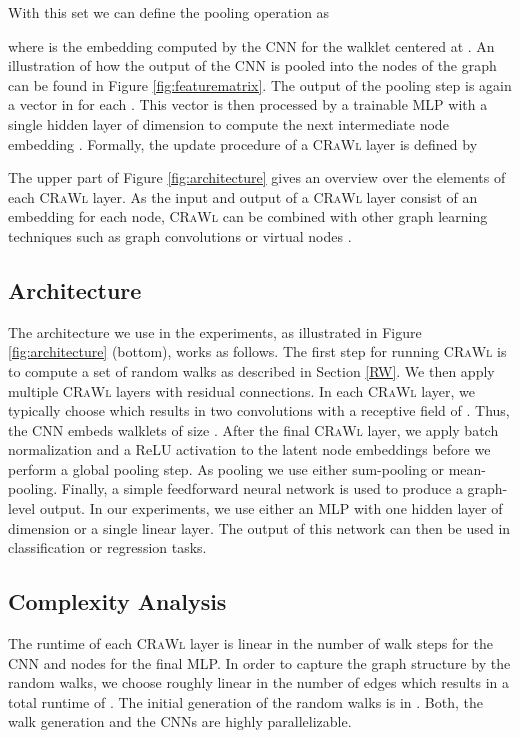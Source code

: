 \documentclass{scrartcl} \usepackage[dvipsnames]{xcolor}
\newcommand{\crawl}{\textsc{CRaWl}}
\begin{document}
    With this set we can define the pooling operation as
    
where  is the embedding computed by the CNN for the walklet  centered at .
    An illustration of how the output of the CNN is pooled into the nodes of the graph can be found in Figure \ref{fig:featurematrix}.
    The output of the pooling step is again a vector in  for each .
    This vector is then processed by a trainable MLP  with a single hidden layer of dimension  to compute the next intermediate node embedding .
Formally, the update procedure of a \crawl{} layer is defined by
    
    The upper part of Figure \ref{fig:architecture} gives an overview over the elements of each \crawl{} layer.
    As the input and output of a \crawl{} layer consist of an embedding for each node, \crawl{} can be combined with other graph learning techniques such as graph convolutions or virtual nodes \cite{GilmerSRVD17,li2017learning,ishiguro2019graph}.



\subsection{Architecture}
    \label{NET}
    The architecture we use in the experiments, as illustrated in Figure \ref{fig:architecture} (bottom), works as follows.
    The first step for running \crawl{} is to compute a set of random walks  as described in Section \ref{RW}.
    We then apply multiple \crawl{} layers with residual connections.
    In each \crawl{} layer, we typically choose  which results in two convolutions with a receptive field of . 
    Thus, the CNN embeds walklets of size .
    After the final \crawl{} layer, we apply batch normalization and a ReLU activation to the latent node embeddings before we perform a global pooling step.
    As pooling we use either sum-pooling or mean-pooling.
    Finally, a simple feedforward neural network is used to produce a graph-level output.
    In our experiments, we use either an MLP with one hidden layer of dimension  or a single linear layer.
    The output of this network can then be used in classification or regression tasks.

\subsection{Complexity Analysis}
    The runtime of each \crawl{} layer is linear in the number of walk steps  for the CNN and nodes  for the final MLP. 
    In order to capture the graph structure by the random walks, we choose  roughly linear in the number of edges which results in a total runtime of .
    The initial generation of the random walks is in .
    Both, the walk generation and the CNNs are highly parallelizable.
\end{document}
